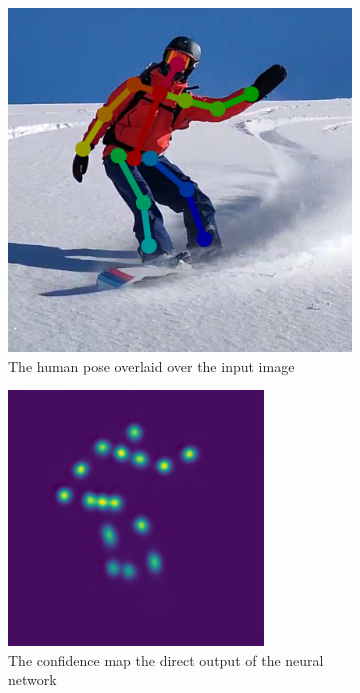 \documentclass[a4paper,12pt]{book}
\begin{document}
\begin{figure}[ht!]  
    \begin{subfigure}[t]{.45\textwidth}
    \center
    \includegraphics[width=1\linewidth]{images/board.png}
    \caption{The human pose overlaid over the input image}
    \label{fig:board}
  \end{subfigure}
  \hspace{2em}
  \begin{subfigure}[t]{.45\textwidth}
    \center
    \includegraphics[width=1\linewidth]{images/board_conf.png}
    \caption{The confidence map the direct output of the neural network}
    \label{fig:conf}
  \end{subfigure}
  \caption{}
  \end{figure}
\end{document}
